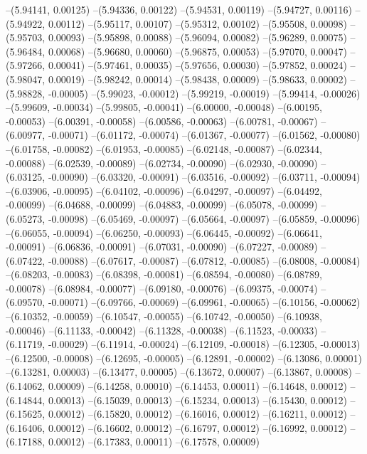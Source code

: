 --(5.94141, 0.00125)
--(5.94336, 0.00122)
--(5.94531, 0.00119)
--(5.94727, 0.00116)
--(5.94922, 0.00112)
--(5.95117, 0.00107)
--(5.95312, 0.00102)
--(5.95508, 0.00098)
--(5.95703, 0.00093)
--(5.95898, 0.00088)
--(5.96094, 0.00082)
--(5.96289, 0.00075)
--(5.96484, 0.00068)
--(5.96680, 0.00060)
--(5.96875, 0.00053)
--(5.97070, 0.00047)
--(5.97266, 0.00041)
--(5.97461, 0.00035)
--(5.97656, 0.00030)
--(5.97852, 0.00024)
--(5.98047, 0.00019)
--(5.98242, 0.00014)
--(5.98438, 0.00009)
--(5.98633, 0.00002)
--(5.98828, -0.00005)
--(5.99023, -0.00012)
--(5.99219, -0.00019)
--(5.99414, -0.00026)
--(5.99609, -0.00034)
--(5.99805, -0.00041)
--(6.00000, -0.00048)
--(6.00195, -0.00053)
--(6.00391, -0.00058)
--(6.00586, -0.00063)
--(6.00781, -0.00067)
--(6.00977, -0.00071)
--(6.01172, -0.00074)
--(6.01367, -0.00077)
--(6.01562, -0.00080)
--(6.01758, -0.00082)
--(6.01953, -0.00085)
--(6.02148, -0.00087)
--(6.02344, -0.00088)
--(6.02539, -0.00089)
--(6.02734, -0.00090)
--(6.02930, -0.00090)
--(6.03125, -0.00090)
--(6.03320, -0.00091)
--(6.03516, -0.00092)
--(6.03711, -0.00094)
--(6.03906, -0.00095)
--(6.04102, -0.00096)
--(6.04297, -0.00097)
--(6.04492, -0.00099)
--(6.04688, -0.00099)
--(6.04883, -0.00099)
--(6.05078, -0.00099)
--(6.05273, -0.00098)
--(6.05469, -0.00097)
--(6.05664, -0.00097)
--(6.05859, -0.00096)
--(6.06055, -0.00094)
--(6.06250, -0.00093)
--(6.06445, -0.00092)
--(6.06641, -0.00091)
--(6.06836, -0.00091)
--(6.07031, -0.00090)
--(6.07227, -0.00089)
--(6.07422, -0.00088)
--(6.07617, -0.00087)
--(6.07812, -0.00085)
--(6.08008, -0.00084)
--(6.08203, -0.00083)
--(6.08398, -0.00081)
--(6.08594, -0.00080)
--(6.08789, -0.00078)
--(6.08984, -0.00077)
--(6.09180, -0.00076)
--(6.09375, -0.00074)
--(6.09570, -0.00071)
--(6.09766, -0.00069)
--(6.09961, -0.00065)
--(6.10156, -0.00062)
--(6.10352, -0.00059)
--(6.10547, -0.00055)
--(6.10742, -0.00050)
--(6.10938, -0.00046)
--(6.11133, -0.00042)
--(6.11328, -0.00038)
--(6.11523, -0.00033)
--(6.11719, -0.00029)
--(6.11914, -0.00024)
--(6.12109, -0.00018)
--(6.12305, -0.00013)
--(6.12500, -0.00008)
--(6.12695, -0.00005)
--(6.12891, -0.00002)
--(6.13086, 0.00001)
--(6.13281, 0.00003)
--(6.13477, 0.00005)
--(6.13672, 0.00007)
--(6.13867, 0.00008)
--(6.14062, 0.00009)
--(6.14258, 0.00010)
--(6.14453, 0.00011)
--(6.14648, 0.00012)
--(6.14844, 0.00013)
--(6.15039, 0.00013)
--(6.15234, 0.00013)
--(6.15430, 0.00012)
--(6.15625, 0.00012)
--(6.15820, 0.00012)
--(6.16016, 0.00012)
--(6.16211, 0.00012)
--(6.16406, 0.00012)
--(6.16602, 0.00012)
--(6.16797, 0.00012)
--(6.16992, 0.00012)
--(6.17188, 0.00012)
--(6.17383, 0.00011)
--(6.17578, 0.00009)
